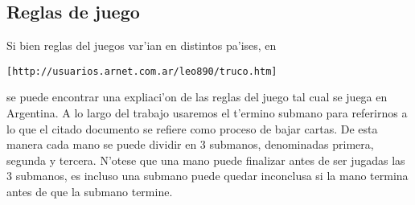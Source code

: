 \subsection{Reglas de juego}
Si bien reglas del juegos var'ian en distintos pa'ises, en 
\begin{verbatim}
[http://usuarios.arnet.com.ar/leo890/truco.htm]
\end{verbatim}
se puede encontrar una expliaci'on de las reglas del juego tal cual se juega en Argentina. A lo largo del trabajo usaremos el t'ermino submano para referirnos a lo que el citado documento se refiere como proceso de bajar cartas. De esta manera cada mano se puede dividir en 3 submanos, denominadas primera, segunda y tercera. N'otese que una mano puede finalizar antes de ser jugadas las 3 submanos, es incluso una submano puede quedar inconclusa si la mano termina antes de que la submano termine.

